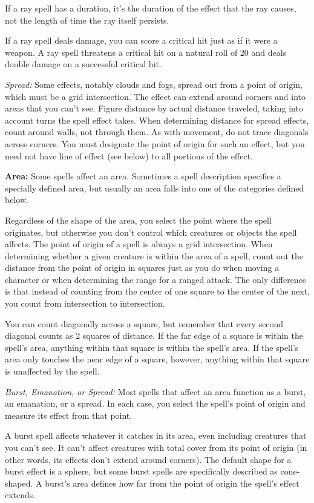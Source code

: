 \documentclass{article}
\begin{document}
If a ray spell has a duration, it's the duration of the effect that the ray causes, 
not the length of time the ray itself persists.

If a ray spell deals damage, you can score a critical hit just as if it were a 
weapon. A ray spell threatens a critical hit on a natural roll of 20 and deals 
double damage on a successful critical hit.

\textit{Spread: }Some effects, notably clouds and fogs, spread out from a point 
of origin, which must be a grid intersection. The effect can extend around corners 
and into areas that you can't see. Figure distance by actual distance traveled, 
taking into account turns the spell effect takes. When determining distance for 
spread effects, count around walls, not through them. As with movement, do not 
trace diagonals across corners. You must designate the point of origin for such 
an effect, but you need not have line of effect (see below) to all portions of 
the effect.

\textbf{Area:} Some spells affect an area. Sometimes a spell description specifies 
a specially defined area, but usually an area falls into one of the categories 
defined below.

Regardless of the shape of the area, you select the point where the spell originates, 
but otherwise you don't control which creatures or objects the spell affects. The 
point of origin of a spell is always a grid intersection. When determining whether 
a given creature is within the area of a spell, count out the distance from the 
point of origin in squares just as you do when moving a character or when determining 
the range for a ranged attack. The only difference is that instead of counting 
from the center of one square to the center of the next, you count from intersection 
to intersection.

You can count diagonally across a square, but remember that every second diagonal 
counts as 2 squares of distance. If the far edge of a square is within the spell's 
area, anything within that square is within the spell's area. If the spell's area 
only touches the near edge of a square, however, anything within that square is 
unaffected by the spell.

\textit{Burst, Emanation, or Spread: }Most spells that affect an area function 
as a burst, an emanation, or a spread. In each case, you select the spell's point 
of origin and measure its effect from that point.

A burst spell affects whatever it catches in its area, even including creatures 
that you can't see. It can't affect creatures with total cover from its point of 
origin (in other words, its effects don't extend around corners). The default shape 
for a burst effect is a sphere, but some burst spells are specifically described 
as cone-shaped. A burst's area defines how far from the point of origin the spell's 
effect extends.
\end{document}
